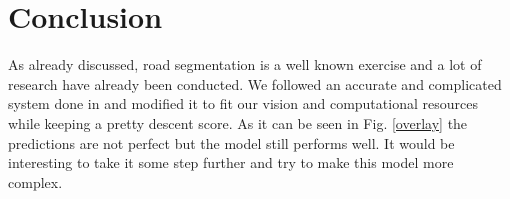 \documentclass[10pt,conference,compsocconf]{IEEEtran}
\begin{document}
\section{Conclusion} \label{conclusion}
As already discussed, road segmentation is a well known exercise and a lot of research have already been conducted. We followed an accurate and complicated system done in \cite{stanford} and modified it to fit our vision and computational resources while keeping a pretty descent score. As it can be seen in Fig. \ref{overlay} the predictions are not perfect but the model still performs well. It would be interesting to take it some step further and try to make this model more complex.


\end{document}
